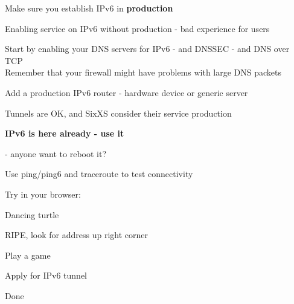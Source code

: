 \documentclass[20pt,landscape,a4paper,footrule]{foils}
\begin{document}
\begin{list1}
\item Make sure you establish IPv6 in {\bf production}
\item Enabling service on IPv6 without production - bad experience for users
\item Start by enabling your DNS servers for IPv6 - and DNSSEC - and DNS over TCP\\
Remember that your firewall might have problems with large DNS packets
\item Add a production IPv6 router - hardware device or generic server
\item Tunnels are OK, and SixXS consider their service production
\end{list1}



\begin{center}
\vskip 5mm
{\color{titlecolor}\LARGE \bf IPv6 is here already - use it}
\vskip 5mm



 - anyone want to reboot it?

\end{center}

\begin{list1}
\item Use ping/ping6 and traceroute to test connectivity
\item Try in your browser:
\begin{list2}
\item {} Dancing turtle
\item {} RIPE, look for address up right corner
\item {} Play a game
\item {} Apply for IPv6 tunnel
\end{list2}
\item Done \smiley
\end{list1}
\end{document}
